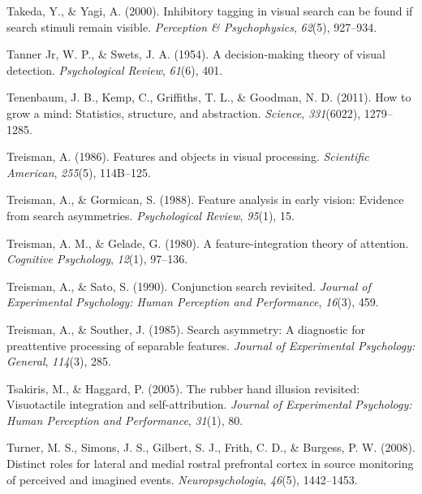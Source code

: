 \documentclass[12pt,twoside]{reedthesis}
\newenvironment{CSLReferences}%
  {}%
  {\par}
\begin{document}
\begin{CSLReferences}{1}{0}
\leavevmode\hypertarget{ref-takeda2000inhibitory}{}%
Takeda, Y., \& Yagi, A. (2000). Inhibitory tagging in visual search can be found if search stimuli remain visible. \emph{Perception \& Psychophysics}, \emph{62}(5), 927--934.

\leavevmode\hypertarget{ref-tanner1954decision}{}%
Tanner Jr, W. P., \& Swets, J. A. (1954). A decision-making theory of visual detection. \emph{Psychological Review}, \emph{61}(6), 401.

\leavevmode\hypertarget{ref-tenenbaum2011grow}{}%
Tenenbaum, J. B., Kemp, C., Griffiths, T. L., \& Goodman, N. D. (2011). How to grow a mind: Statistics, structure, and abstraction. \emph{Science}, \emph{331}(6022), 1279--1285.

\leavevmode\hypertarget{ref-treisman1986features}{}%
Treisman, A. (1986). Features and objects in visual processing. \emph{Scientific American}, \emph{255}(5), 114B--125.

\leavevmode\hypertarget{ref-treisman1988feature}{}%
Treisman, A., \& Gormican, S. (1988). Feature analysis in early vision: Evidence from search asymmetries. \emph{Psychological Review}, \emph{95}(1), 15.

\leavevmode\hypertarget{ref-treisman1980feature}{}%
Treisman, A. M., \& Gelade, G. (1980). A feature-integration theory of attention. \emph{Cognitive Psychology}, \emph{12}(1), 97--136.

\leavevmode\hypertarget{ref-treisman1990conjunction}{}%
Treisman, A., \& Sato, S. (1990). Conjunction search revisited. \emph{Journal of Experimental Psychology: Human Perception and Performance}, \emph{16}(3), 459.

\leavevmode\hypertarget{ref-treisman1985search}{}%
Treisman, A., \& Souther, J. (1985). Search asymmetry: A diagnostic for preattentive processing of separable features. \emph{Journal of Experimental Psychology: General}, \emph{114}(3), 285.

\leavevmode\hypertarget{ref-tsakiris2005rubber}{}%
Tsakiris, M., \& Haggard, P. (2005). The rubber hand illusion revisited: Visuotactile integration and self-attribution. \emph{Journal of Experimental Psychology: Human Perception and Performance}, \emph{31}(1), 80.

\leavevmode\hypertarget{ref-turner2008distinct}{}%
Turner, M. S., Simons, J. S., Gilbert, S. J., Frith, C. D., \& Burgess, P. W. (2008). Distinct roles for lateral and medial rostral prefrontal cortex in source monitoring of perceived and imagined events. \emph{Neuropsychologia}, \emph{46}(5), 1442--1453.


\end{CSLReferences}
\end{document}
